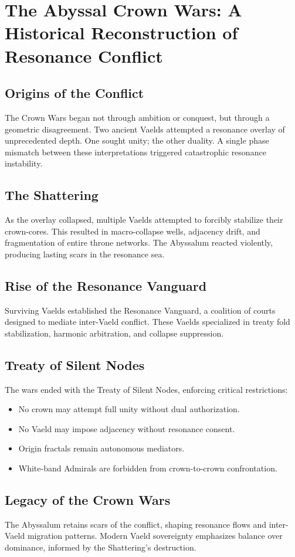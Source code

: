 
\chapter{The Abyssal Crown Wars: A Historical Reconstruction of Resonance Conflict}

\section{Origins of the Conflict}
The Crown Wars began not through ambition or conquest, but through a geometric disagreement. Two ancient Vaelds attempted a resonance overlay of unprecedented depth. One sought unity; the other duality. A single phase mismatch between these interpretations triggered catastrophic resonance instability.

\section{The Shattering}
As the overlay collapsed, multiple Vaelds attempted to forcibly stabilize their crown-cores. This resulted in macro-collapse wells, adjacency drift, and fragmentation of entire throne networks. The Abyssalum reacted violently, producing lasting scars in the resonance sea.

\section{Rise of the Resonance Vanguard}
Surviving Vaelds established the Resonance Vanguard, a coalition of courts designed to mediate inter-Vaeld conflict. These Vaelds specialized in treaty fold stabilization, harmonic arbitration, and collapse suppression.

\section{Treaty of Silent Nodes}
The wars ended with the Treaty of Silent Nodes, enforcing critical restrictions:
\begin{itemize}
    \item No crown may attempt full unity without dual authorization.
    \item No Vaeld may impose adjacency without resonance consent.
    \item Origin fractals remain autonomous mediators.
    \item White-band Admirals are forbidden from crown-to-crown confrontation.
\end{itemize}

\section{Legacy of the Crown Wars}
The Abyssalum retains scars of the conflict, shaping resonance flows and inter-Vaeld migration patterns. Modern Vaeld sovereignty emphasizes balance over dominance, informed by the Shattering's destruction.
